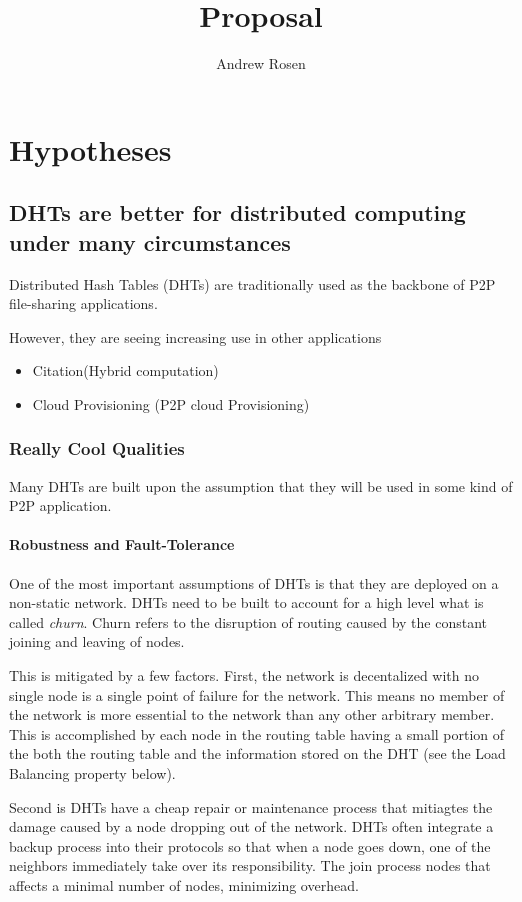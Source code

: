 \documentclass[10pt,letterpaper]{report}
\title{Proposal}
\author{Andrew Rosen}
\begin{document}
\maketitle
\setcounter{tocdepth}{4}
\tableofcontents
\newpage
\chapter{Hypotheses}

\section{DHTs are better for distributed computing under many circumstances}
Distributed Hash Tables (DHTs) are traditionally used as the backbone of P2P file-sharing applications.

However, they are seeing increasing use in other applications
\begin{itemize}
    \item Citation(Hybrid computation)
    \item Cloud Provisioning  (P2P cloud Provisioning)
\end{itemize}


\subsection{Really Cool Qualities}
Many DHTs are built upon the assumption that they will be used in some kind of P2P application.
\subsubsection{Robustness and Fault-Tolerance}
One of the most important assumptions of DHTs is that they are deployed on a non-static network.
DHTs need to be built to account for a high level what is called \textit{churn}.  
Churn refers to the disruption of routing caused by the constant joining and leaving of nodes.

This is mitigated by a few factors.
First, the network is decentalized with no single node is a single point of failure for the network.
This means  no member of the network is more essential to the network than any other arbitrary member. %
This is accomplished by each node in the routing table having a small portion of the both the routing table and the information stored on the DHT (see the Load Balancing property below).

Second is DHTs have a cheap repair or maintenance process that mitiagtes the damage caused by a node dropping out of the network.
DHTs often integrate a backup process into their protocols so that when a node goes down, one of the neighbors immediately take over its responsibility.
The join process  nodes that affects a minimal number of nodes, minimizing overhead. 
\end{document}
